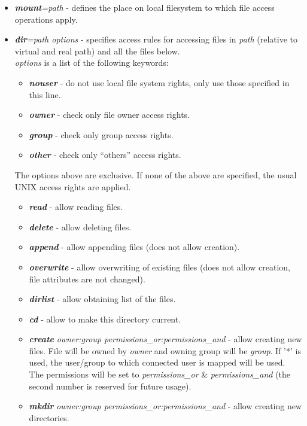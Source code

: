 \documentclass{article}
\begin{document}
\begin{itemize}
\item \textbf{\textit{mount}}\textit{=path} - defines the place on
  local filesystem to which file access operations apply.
\item \textbf{\textit{dir}}\textit{=path options} - specifies access
  rules for accessing files in \textit{path} (relative to virtual and
  real path) and all the files below. \\ \textit{options} is a list of
  the following keywords:

\begin{itemize}
\item \textbf{\textit{nouser}} - do not use local file system rights, only
use those specified in this line.
\item \textbf{\textit{owner}} - check only file owner access rights.
\item \textbf{\textit{group}} - check only group access rights.
\item \textbf{\textit{other}} - check only ``others'' access rights.
\end{itemize}

The options above are exclusive. If none of the above are specified, the usual
UNIX access rights are applied.

\begin{itemize}
\item \textbf{\textit{read}} - allow reading files.
\item \textbf{\textit{delete}} - allow deleting files.
\item \textbf{\textit{append}} - allow appending files (does not allow creation).
\item \textbf{\textit{overwrite}} - allow overwriting of existing files
(does not allow creation, file attributes are not changed).
\item \textbf{\textit{dirlist}} - allow obtaining list of the files.
\item \textbf{\textit{cd}} - allow to make this directory current.
\item \textbf{\textit{create}} \textit{owner:group permissions\_or:permissions\_and}
- allow creating new files. File will be owned by \textit{owner} and
owning group will be \textit{group}. If '{*}' is used, the user/group
to which connected user is mapped will be used. The permissions will
be set to \textit{permissions\_or} \& \textit{permissions\_and} (the second
number is reserved for future usage). 
\item \textbf{\textit{mkdir}} \textit{owner:group permissions\_or:permissions\_and}
- allow creating new directories.
\end{itemize}
\end{itemize}
\end{document}
